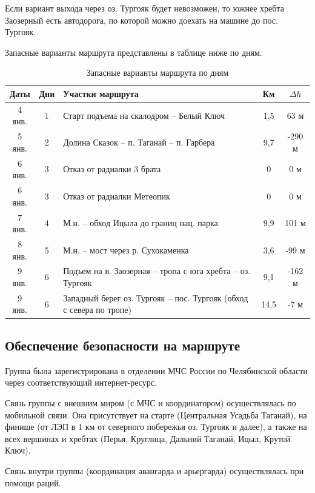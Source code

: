 Если вариант выхода через оз. Тургояк будет невозможен, то южнее хребта Заозерный есть автодорога, по которой можно доехать на машине до пос. Тургояк.

Запасные варианты маршрута представлены в таблице ниже по дням.

\begin{table}[h!]
	\centering
	\caption{Запасные варианты маршрута по дням}
	\begin{tabular}{|c|c|m{9cm}|c|c|}
		\hline
		\textbf{Даты} & \textbf{Дни} & \textbf{Участки маршрута} & \textbf{Км} & $\Delta h$ \\
		\hline
		4 янв. & 1 & Старт подъема на скалодром – Белый Ключ & 1,5 & 63 м \\
		\hline
		5 янв. & 2 & Долина Сказок – п. Таганай – п. Гарбера & 9,7 & -290 м \\
		\hline
		6 янв. & 3 & Отказ от радиалки 3 брата & 0 & 0 м \\
		\hline
		6 янв. & 3 & Отказ от радиалки Метеопик & 0 & 0 м \\
		\hline
		7 янв. & 4 & М.н. – обход Ицыла до границ нац. парка & 9,9 & 101 м \\
		\hline
		8 янв. & 5 & М.н. – мост через р. Сухокаменка & 3,6 & -99 м \\
		\hline
		9 янв. & 6 & Подъем на в. Заозерная – тропа с юга хребта – оз. Тургояк & 9,1 & -162 м \\
		\hline
		9 янв. & 6 & Западный берег оз. Тургояк – пос. Тургояк (обход с севера по тропе) & 14,5 & -7 м \\
		\hline
	\end{tabular}
\end{table}


\clearpage


\subsection{Обеспечение безопасности на маршруте}
Группа была зарегистрирована в отделении МЧС России по Челябинской области через соответствующий интернет-ресурс.

Связь группы с внешним миром (с МЧС и координатором) осуществлялась по мобильной связи. Она присутствует на старте (Центральная Усадьба Таганай), на финише (от ЛЭП в 1 км от северного побережья оз. Тургояк и далее), а также на всех вершинах и хребтах (Перья, Круглица, Дальний Таганай, Ицыл, Крутой Ключ).

Связь внутри группы (координация авангарда и арьергарда) осуществлялась при помощи раций.

